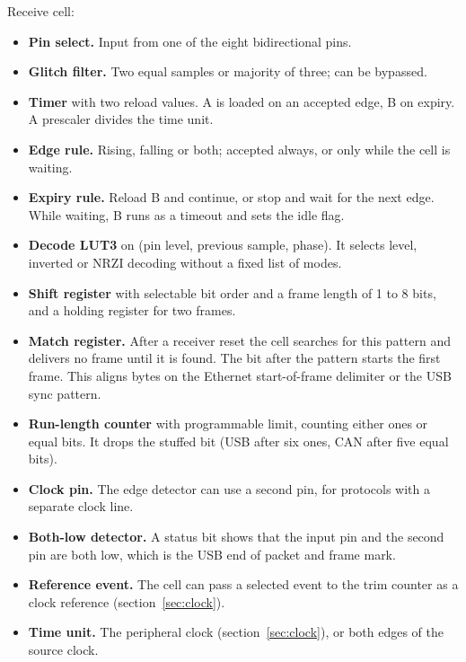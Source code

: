 \documentclass[10pt,a4paper]{article}
\begin{document}
Receive cell:
\begin{itemize}
\item \textbf{Pin select.} Input from one of the eight bidirectional pins.
\item \textbf{Glitch filter.} Two equal samples or majority of three; can be bypassed.
\item \textbf{Timer} with two reload values. A is loaded on an accepted edge, B on expiry. A prescaler divides
the time unit.
\item \textbf{Edge rule.} Rising, falling or both; accepted always, or only while the cell is waiting.
\item \textbf{Expiry rule.} Reload B and continue, or stop and wait for the next edge. While waiting, B runs as a
timeout and sets the idle flag.
\item \textbf{Decode LUT3} on (pin level, previous sample, phase). It selects level, inverted or NRZI decoding
without a fixed list of modes.
\item \textbf{Shift register} with selectable bit order and a frame length of 1 to 8 bits, and a holding register
for two frames.
\item \textbf{Match register.} After a receiver reset the cell searches for this pattern and delivers no frame
until it is found. The bit after the pattern starts the first frame. This aligns bytes on the Ethernet
start-of-frame delimiter or the USB sync pattern.
\item \textbf{Run-length counter} with programmable limit, counting either ones or equal bits. It drops the
stuffed bit (USB after six ones, CAN after five equal bits).
\item \textbf{Clock pin.} The edge detector can use a second pin, for protocols with a separate clock line.
\item \textbf{Both-low detector.} A status bit shows that the input pin and the second pin are both low, which is
the USB end of packet and frame mark.
\item \textbf{Reference event.} The cell can pass a selected event to the trim counter as a clock reference
(section~\ref{sec:clock}).
\item \textbf{Time unit.} The peripheral clock (section~\ref{sec:clock}), or both edges of the source clock.
\end{itemize}
\end{document}
